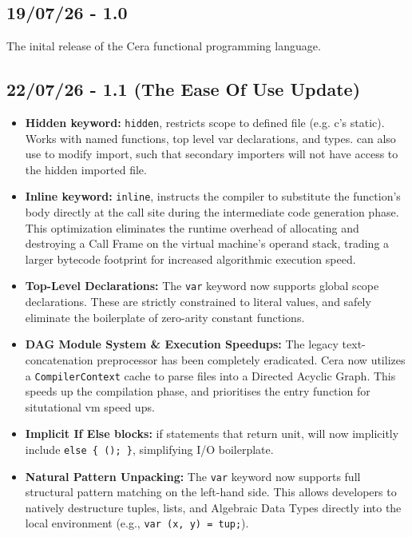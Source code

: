 \documentclass[11pt, a4paper]{article}
\begin{document}
\subsection{19/07/26 - 1.0}
The inital release of the Cera functional programming language.

\subsection*{22/07/26 - 1.1 (The Ease Of Use Update)} 

\begin{itemize}
    \item \textbf{Hidden keyword: } \texttt{hidden}, restricts scope to defined file (e.g. c's static). Works with named functions, top level var declarations, and types. can also use to modify import, such that secondary importers will not have access to the hidden imported file.
    \item \textbf{Inline keyword: } \texttt{inline}, instructs the compiler to substitute the function's body directly at the call site during the intermediate code generation phase. This optimization eliminates the runtime overhead of allocating and destroying a Call Frame on the virtual machine's operand stack, trading a larger bytecode footprint for increased algorithmic execution speed.
    \item \textbf{Top-Level Declarations:} The \texttt{var} keyword now supports global scope declarations. These are strictly constrained to literal values, and safely eliminate the boilerplate of zero-arity constant functions.
    \item \textbf{DAG Module System \& Execution Speedups:} The legacy text-concatenation preprocessor has been completely eradicated. Cera now utilizes a \texttt{CompilerContext} cache to parse files into a Directed Acyclic Graph. This speeds up the compilation phase, and prioritises the entry function for situtational vm speed ups.
    \item \textbf{Implicit If Else blocks: } if statements that return unit, will now implicitly include \texttt{else \{ (); \}}, simplifying I/O boilerplate. 
    \item \textbf{Natural Pattern Unpacking: } The \texttt{var} keyword now supports full structural pattern matching on the left-hand side. This allows developers to natively destructure tuples, lists, and Algebraic Data Types directly into the local environment (e.g., \texttt{var (x, y) = tup;}).

\end{itemize}
\end{document}
